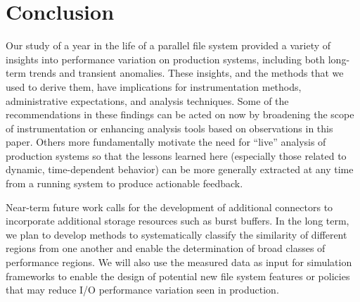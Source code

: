 \section{Conclusion} \label{sec:conclusions}
Our study of a year in the life of a parallel file system provided a
variety of insights into performance variation on production systems,
including both long-term trends and transient anomalies.  These insights,
and the methods that we used to derive them, have implications for
instrumentation methods, administrative expectations, and analysis
techniques. Some of the recommendations in these findings can be acted on
now by broadening the scope of instrumentation or enhancing analysis tools based on observations in this paper.
Others more fundamentally motivate the need for ``live'' analysis of
production systems so that the lessons learned here (especially those
related to dynamic, time-dependent behavior) can be more generally extracted
at any time from a running system to produce actionable feedback.

Near-term future work calls for the development of additional \tokio
connectors to incorporate additional storage resources such as burst
buffers.
In the long term, we plan to develop methods to systematically classify the
similarity of different regions from one another and enable the
determination of broad classes of performance regions.
We will also use the measured data as input for simulation frameworks to
enable the design of potential new file system features or policies that may
reduce I/O performance variation seen in production. 
\endinput

